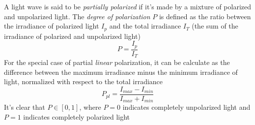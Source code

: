 \documentclass[../electromagnetism.tex]{subfiles}
\begin{document}
\begin{dfn}
	A light wave is said to be \textit{partially polarized} if it's made by a mixture of polarized and unpolarized light. The \textit{degree of polarization} $P$ is defined as the ratio between the irradiance of polarized light $I_p$ and the total irradiance $I_T$ (the sum of the irradiance of polarized and unpolarized light)
	\begin{equation*}
		P=\frac{I_p}{I_T}
	\end{equation*}
	For the special case of partial \emph{linear} polarization, it can be calculate as the difference between the maximum irradiance minus the minimum irradiance of light, normalized with respect to the total irradiance
	\begin{equation*}
		P_{pl}=\frac{I_{max}-I_{min}}{I_{max}+I_{min}}
	\end{equation*}
	It's clear that $P\in[0,1]$, where $P=0$ indicates completely unpolarized light and $P=1$ indicates completely polarized light
\end{dfn}
\end{document}
